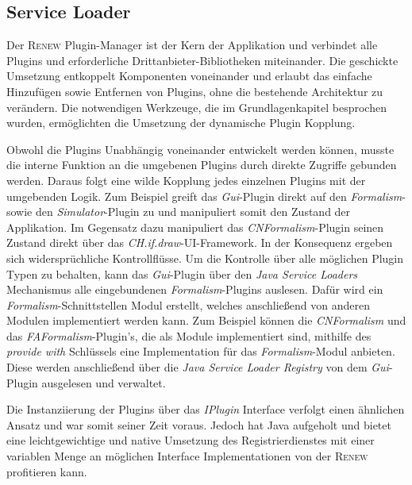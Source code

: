 	\newpage
	\subsection{Service Loader} 
		Der \textsc{Renew} Plugin-Manager ist der Kern der Applikation und verbindet alle Plugins und erforderliche Drittanbieter-Bibliotheken miteinander. Die geschickte Umsetzung entkoppelt Komponenten voneinander und erlaubt das einfache Hinzufügen sowie Entfernen von Plugins, ohne die bestehende Architektur zu verändern. Die notwendigen Werkzeuge, die im Grundlagenkapitel besprochen wurden, ermöglichten die Umsetzung der dynamische Plugin Kopplung. \bigbreak

		Obwohl die Plugins Unabhängig voneinander entwickelt werden können, musste die interne Funktion an die umgebenen Plugins durch direkte Zugriffe gebunden werden. Daraus folgt eine wilde Kopplung jedes einzelnen Plugins mit der umgebenden Logik. Zum Beispiel greift das \textit{Gui}-Plugin direkt auf den \textit{Formalism}- sowie den \textit{Simulator}-Plugin zu und manipuliert somit den Zustand der Applikation. Im Gegensatz dazu manipuliert das \textit{CNFormalism}-Plugin seinen Zustand direkt über das \textit{CH.if.draw}-UI-Framework. In der Konsequenz ergeben sich widersprüchliche Kontrollflüsse.\newline  
		Um die Kontrolle über alle möglichen Plugin Typen zu behalten, kann das \textit{Gui}-Plugin über den \textit{Java Service Loaders} Mechanismus alle eingebundenen \textit{Formalism}-Plugins auslesen. Dafür wird ein \textit{Formalism}-Schnittstellen Modul erstellt, welches anschließend von anderen Modulen implementiert werden kann. Zum Beispiel können die \textit{CNFormalism} und das \textit{FAFormalism}-Plugin's, die als Module implementiert sind, mithilfe des \textit{provide with} Schlüssels eine Implementation für das \textit{Formalism}-Modul anbieten. Diese werden anschließend über die \textit{Java Service Loader Registry} von dem \textit{Gui}-Plugin ausgelesen und verwaltet. \bigbreak

		Die Instanziierung der Plugins über das \textit{IPlugin} Interface verfolgt einen ähnlichen Ansatz und war somit seiner Zeit voraus. Jedoch hat Java aufgeholt und bietet eine leichtgewichtige und native Umsetzung des Registrierdienstes mit einer variablen Menge an möglichen Interface Implementationen von der \textsc{Renew} profitieren kann.   

